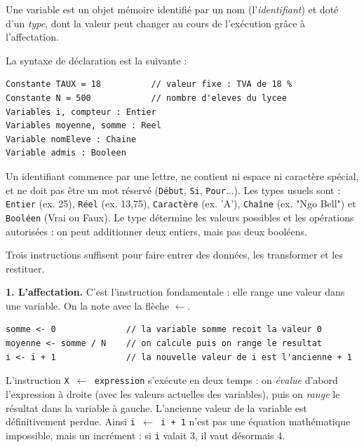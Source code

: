 \documentclass[11pt]{article}
\newcommand{\cle}[1]{{\popxbold\color{popdark}#1}}
\newcounter{popsec}
\newcounter{popsub}
\newcommand{\courssub}[1]{%
  \stepcounter{popsub}%
  \par\vspace{9pt}\noindent{\popxbold\fontsize{11.5}{13}\selectfont\color{popink}{\color{poporange}\thepopsec.\thepopsub}\hspace{6pt}#1}\par\nopagebreak\vspace{4pt}
}
\begin{document}
\begin{definition}[Variable]
Une \cle{variable} est un objet mémoire identifié par un nom (l'\emph{identifiant}) et doté d'un \emph{type}, dont la valeur peut changer au cours de l'exécution grâce à l'affectation.
\end{definition}

La syntaxe de déclaration est la suivante :

\begin{lstlisting}
Constante TAUX = 18          // valeur fixe : TVA de 18 %
Constante N = 500            // nombre d'eleves du lycee
Variables i, compteur : Entier
Variables moyenne, somme : Reel
Variable nomEleve : Chaine
Variable admis : Booleen
\end{lstlisting}

\begin{propriete}
Un identifiant commence par une lettre, ne contient ni espace ni caractère spécial, et ne doit pas être un mot réservé (\texttt{Début}, \texttt{Si}, \texttt{Pour}...). Les types usuels sont : \texttt{Entier} (ex. 25), \texttt{Réel} (ex. 13,75), \texttt{Caractère} (ex. 'A'), \texttt{Chaîne} (ex. "Ngo Bell") et \texttt{Booléen} (Vrai ou Faux). Le type détermine les valeurs possibles et les opérations autorisées : on peut additionner deux entiers, mais pas deux booléens.
\end{propriete}

\courssub{Les instructions simples}

Trois instructions suffisent pour faire entrer des données, les transformer et les restituer.

\textbf{1. L'affectation.} C'est l'instruction fondamentale : elle range une valeur dans une variable. On la note avec la flèche $\leftarrow$.

\begin{lstlisting}
somme <- 0              // la variable somme recoit la valeur 0
moyenne <- somme / N    // on calcule puis on range le resultat
i <- i + 1              // la nouvelle valeur de i est l'ancienne + 1
\end{lstlisting}

\begin{propriete}
L'instruction \texttt{X $\leftarrow$ expression} s'exécute en deux temps : on \emph{évalue} d'abord l'expression à droite (avec les valeurs actuelles des variables), puis on \emph{range} le résultat dans la variable à gauche. L'ancienne valeur de la variable est définitivement perdue. Ainsi \texttt{i $\leftarrow$ i + 1} n'est pas une équation mathématique impossible, mais un incrément : si \texttt{i} valait 3, il vaut désormais 4.
\end{propriete}
\end{document}

